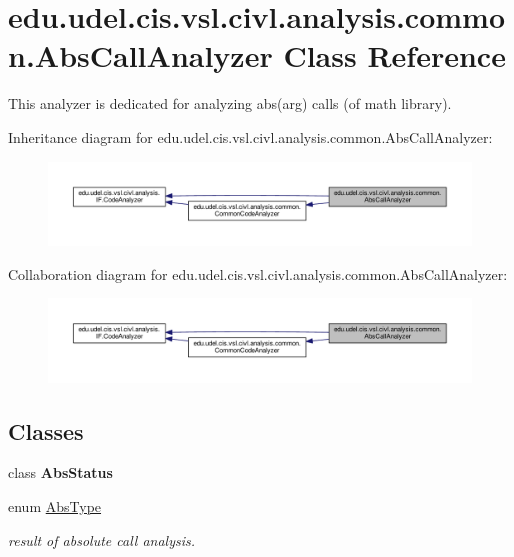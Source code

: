 \hypertarget{classedu_1_1udel_1_1cis_1_1vsl_1_1civl_1_1analysis_1_1common_1_1AbsCallAnalyzer}{}\section{edu.\+udel.\+cis.\+vsl.\+civl.\+analysis.\+common.\+Abs\+Call\+Analyzer Class Reference}
\label{classedu_1_1udel_1_1cis_1_1vsl_1_1civl_1_1analysis_1_1common_1_1AbsCallAnalyzer}


This analyzer is dedicated for analyzing abs(arg) calls (of math library).  




Inheritance diagram for edu.\+udel.\+cis.\+vsl.\+civl.\+analysis.\+common.\+Abs\+Call\+Analyzer\+:
\nopagebreak
\begin{figure}[H]
\begin{center}
\leavevmode
\includegraphics[width=350pt]{classedu_1_1udel_1_1cis_1_1vsl_1_1civl_1_1analysis_1_1common_1_1AbsCallAnalyzer__inherit__graph}
\end{center}
\end{figure}


Collaboration diagram for edu.\+udel.\+cis.\+vsl.\+civl.\+analysis.\+common.\+Abs\+Call\+Analyzer\+:
\nopagebreak
\begin{figure}[H]
\begin{center}
\leavevmode
\includegraphics[width=350pt]{classedu_1_1udel_1_1cis_1_1vsl_1_1civl_1_1analysis_1_1common_1_1AbsCallAnalyzer__coll__graph}
\end{center}
\end{figure}
\subsection*{Classes}
\begin{DoxyCompactItemize}
\item 
class {\bfseries Abs\+Status}
\item 
enum \hyperlink{enumedu_1_1udel_1_1cis_1_1vsl_1_1civl_1_1analysis_1_1common_1_1AbsCallAnalyzer_1_1AbsType}{Abs\+Type}
\begin{DoxyCompactList}\small\item\em result of absolute call analysis. \end{DoxyCompactList}\end{DoxyCompactItemize}
